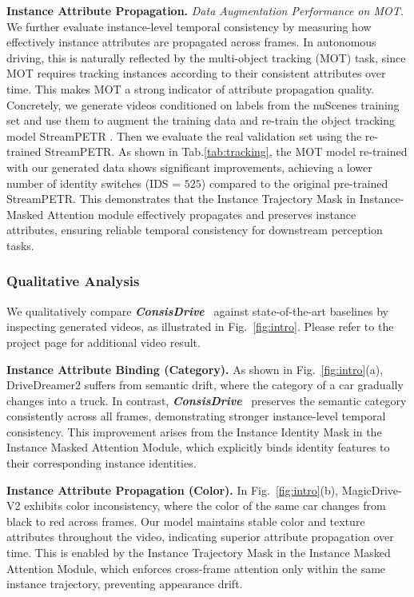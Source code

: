 \documentclass{article} %
\def\titleDef{\textbf{\textit{ConsisDrive}}}
\begin{document}
\noindent\textbf{Instance Attribute Propagation.}  \textit{Data Augmentation Performance on MOT.} We further evaluate instance-level temporal consistency by measuring how effectively instance attributes are propagated across frames. 
In autonomous driving, this is naturally reflected by the multi-object tracking (MOT) task, 
since MOT requires tracking instances according to their consistent attributes over time. 
This makes MOT a strong indicator of attribute propagation quality.  
Concretely, we generate videos conditioned on labels from the nuScenes training set and use them to augment the training data and re-train the object tracking model StreamPETR \cite{streampetr}. Then we evaluate the real validation set using the re-trained StreamPETR.
As shown in Tab.\ref{tab:tracking},
the MOT model re-trained with our generated data shows significant improvements, achieving a lower number of identity switches (IDS = $525$) compared to the original pre-trained StreamPETR.  
This demonstrates that the Instance Trajectory Mask in Instance-Masked Attention module effectively propagates and preserves instance attributes, ensuring reliable temporal consistency for downstream perception tasks.  





\subsubsection{Qualitative Analysis}
We qualitatively compare \titleDef~ against state-of-the-art baselines by inspecting generated videos, as illustrated in Fig.~\ref{fig:intro}.  
Please refer to the project page for additional video result.

\noindent \textbf{Instance Attribute Binding (Category).}  
As shown in Fig.~\ref{fig:intro}(a), DriveDreamer2 suffers from semantic drift, where the category of a car gradually changes into a truck. 
%  
In contrast, \titleDef~ preserves the semantic category consistently across all frames, demonstrating stronger instance-level temporal consistency.  
This improvement arises from the Instance Identity Mask in the Instance Masked Attention Module, which explicitly binds identity features to their corresponding instance identities.  

\noindent \textbf{Instance Attribute Propagation (Color).}  
In Fig.~\ref{fig:intro}(b), MagicDrive-V2 exhibits color inconsistency, where the color of the same car changes from black to red across frames.  
Our model maintains stable color and texture attributes throughout the video, indicating superior attribute propagation over time.  
This is enabled by the Instance Trajectory Mask in the Instance Masked Attention Module, which enforces cross-frame attention only within the same instance trajectory, preventing appearance drift.  
\end{document}
